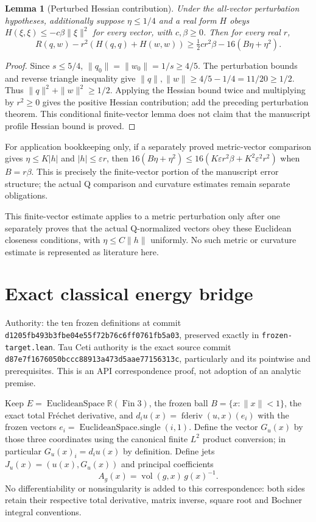 \documentclass[11pt]{article}
\newtheorem{lemma}[theorem]{Lemma}
\theoremstyle{definition}
\theoremstyle{remark}
\numberwithin{equation}{section}
\begin{document}
\begin{lemma}[Perturbed Hessian contribution]\label{geometry-perturb:hessian}
Under the all-vector perturbation hypotheses, additionally suppose
$\eta\le1/4$ and a real form $H$ obeys
$H(\xi,\xi)\le-c\beta\|\xi\|^2$ for every vector, with $c,\beta\ge0$.
Then for every real $r$,
\[
 R(q,w)-r^2(H(q,q)+H(w,w))
 \ge\tfrac12 c r^2\beta-16(B\eta+\eta^2).
\]
\end{lemma}
\begin{proof}
Since $s\le5/4$, $\|q_0\|=\|w_0\|=1/s\ge4/5$.
The perturbation bounds and reverse triangle inequality give
$\|q\|,\|w\|\ge4/5-1/4=11/20\ge1/2$. Thus
$\|q\|^2+\|w\|^2\ge1/2$. Applying the Hessian bound twice
and multiplying by $r^2\ge0$ gives the positive Hessian contribution;
add the preceding perturbation theorem. This conditional finite-vector
lemma does not claim that the manuscript profile Hessian bound is proved.
\end{proof}
For application bookkeeping only, if a separately proved metric-vector
comparison gives $\eta\le K|h|$ and $|h|\le\varepsilon r$,
then $16(B\eta+\eta^2)\le16(K\varepsilon r^2\beta+
K^2\varepsilon^2r^2)$ when $B=r\beta$. This is precisely the
finite-vector portion of the manuscript error structure; the actual
Q comparison and curvature estimates remain separate obligations.

This finite-vector estimate applies to a metric perturbation only after
one separately proves that the actual Q-normalized vectors obey these
Euclidean closeness conditions, with $\eta\le C\|h\|$ uniformly.
No such metric or curvature estimate is represented as literature here.


\clearpage

\section{Exact classical energy bridge}\label{energy-bridge:integral}\label{energy-bridge:gradient}
Authority: the ten frozen definitions at commit
\texttt{d1205fb493b3fbe04e55f\allowbreak72b76c6ff0761fb5a03}, preserved exactly in
\texttt{frozen-target.lean}. Tau Ceti authority is the exact source commit
\texttt{d87e7f1676050bccc889\allowbreak13a473d5aae77156313c}, particularly
 and its pointwise
 and  prerequisites.
This is an API correspondence proof, not adoption of an analytic premise.

Keep $E=\operatorname{EuclideanSpace}\mathbb R(\operatorname{Fin}3)$, the
frozen ball $B=\{x:\|x\|<1\}$, the exact total Fr\'echet derivative, and
$d_i u(x)=\operatorname{fderiv}(u,x)(e_i)$ with the frozen vectors
$e_i=\operatorname{EuclideanSpace.single}(i,1)$. Define the vector $G_u(x)$
by those three coordinates using the canonical finite $L^2$ product conversion;
in particular $G_u(x)_i=d_i u(x)$ by definition. Define jets
$J_u(x)=(u(x),G_u(x))$ and principal coefficients
\[
 A_g(x)=\operatorname{vol}(g,x)\,g(x)^{-1}.
\]
No differentiability or nonsingularity is added to this correspondence:
both sides retain their respective total derivative, matrix inverse, square
root and Bochner integral conventions.
\end{document}
